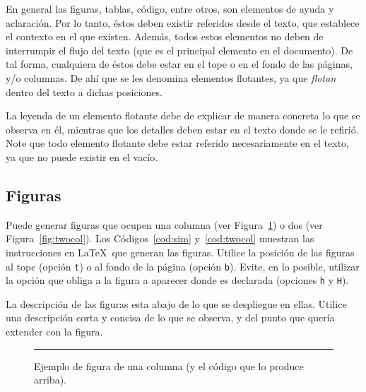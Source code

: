 \documentclass[twocolumn,11pts]{IEEEtran}
\begin{document}
En general las figuras, tablas, código, entre otros, son elementos de ayuda y aclaración. Por lo tanto, éstos deben existir referidos desde el texto, que establece el contexto en el que existen. Además, todos estos elementos no deben de interrumpir el flujo del texto (que es el principal elemento en el documento). De tal forma, cualquiera de éstos debe estar en el tope o en el fondo de las páginas, y/o columnas. De ahí que se les denomina elementos flotantes, ya que \emph{flotan} dentro del texto a dichas posiciones. 

La leyenda de un elemento flotante debe de explicar de manera concreta lo que se observa en él, mientras que los detalles deben estar en el texto donde se le refirió. Note que todo elemento flotante debe estar referido necesariamente en el texto, ya que no puede existir en el vacío.


\subsection{Figuras}
\label{sec:figuras}

Puede generar figuras que ocupen una columna (ver Figura~\ref{fig:sim}) o dos (ver Figura~\ref{fig:twocol}). Los Códigos~\ref{cod:sim} y~\ref{cod:twocol} muestran las instrucciones en \LaTeX\ que generan las figuras. Utilice la posición de las figuras al tope (opción \texttt{t}) o al fondo de la página (opción \texttt{b}). Evite, en lo posible, utilizar la opción que obliga a la figura a aparecer donde es declarada (opciones \texttt{h} y \texttt{H}).

La descripción de las figuras esta abajo de lo que se despliegue en ellas. Utilice una descripción corta y concisa de lo que se observa, y del punto que quería extender con la figura.

\begin{figure}[t]%
  \centering
  \rule{0.8\linewidth}{2cm}
  \caption{Ejemplo de figura de una columna (y el c\'odigo que lo produce arriba).}
  \label{fig:sim}
\end{figure}
\end{document}
